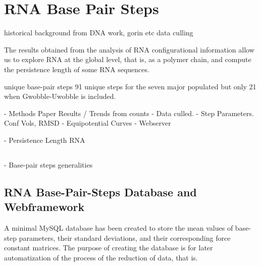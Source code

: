 \chapter{RNA Base Pair Steps}
\label{basepairsteps} 





historical background from DNA work, gorin etc
data culling


The   results  obtained   from  the  analysis   of  RNA
configurational  information allow  us to  explore RNA  at  the global
level, that is, as a polymer chain, and compute the persistence length
of some RNA sequences.






unique base-pair steps
91 unique steps for the seven major populated but only 21 when
Gwobble-Uwobble is included.

- Methods Paper Results / Trends from counts
  - Data culled.
- Step Parameters. Conf Vols, RMSD
- Equipotential Curves
- Webserver


- Persistence Length RNA





\section{}

- Base-pair steps generalities






  


\section{RNA Base-Pair-Steps Database and Webframework}
A minimal MySQL database has been  created to store the mean values of
base-step   parameters,   their   standard   deviations,   and   their
corresponding  force constant  matrices. The  purpose of  creating the
database is for  later automatization of the process  of the reduction
of data, that is.

